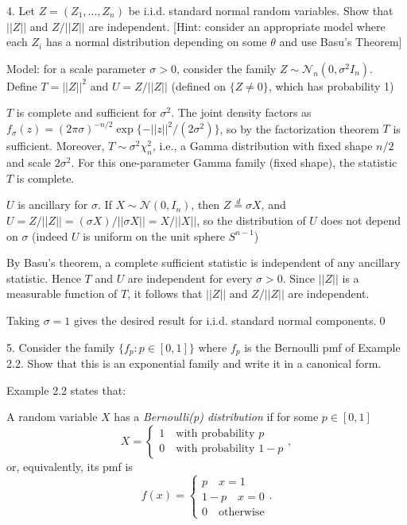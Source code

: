 \documentclass[10pt]{article}
\begin{document}
\hfill 

4. Let $Z = (Z_1, …, Z_n)$ be i.i.d. standard normal random variables. Show that $||Z||$ and $Z / ||Z||$ are independent. [Hint: consider an appropriate model where each $Z_i $ has a normal distribution depending on some $\theta $ and use Basu's Theorem]

Model: for a scale parameter $\sigma > 0 $, consider the family $Z \sim \mathcal{N}_n(0, \sigma^2I_n)$. Define $T = ||Z||^2 $ and $U = Z / ||Z|| $ (defined on $\{Z \neq 0\}$, which has probability 1)

$T $ is complete and sufficient for $\sigma^2 $. The joint density factors as $f_\sigma(z) = (2\pi\sigma)^{-n / 2} \exp\{-||z||^2 / (2\sigma^2)\}$, so by the factorization theorem $T $ is sufficient. Moreover, $T \sim \sigma^2\chi_n^2 $, i.e., a Gamma distribution with fixed shape $n / 2 $ and scale $2 \sigma^2 $. For this one-parameter Gamma family (fixed shape), the statistic $T $ is complete.

$U $ is ancillary for $\sigma $. If $X \sim \mathcal{N}(0, I_n)$, then $Z \stackrel{d}{=} \sigma X $, and $U = Z / ||Z|| = (\sigma X) / ||\sigma X|| = X / ||X||$, so the distribution of $U $ does not depend on $\sigma $ (indeed $U $ is uniform on the unit sphere $S^{n - 1}$)

By Basu's theorem, a complete sufficient statistic is independent of any ancillary statistic. Hence $T $ and $U $ are independent for every $\sigma > 0 $. Since $||Z|| $ is a measurable function of $T $, it follows that $||Z||$ and $Z / ||Z|| $ are independent. 

Taking $\sigma = 1 $ gives the desired result for i.i.d. standard normal components.\qed 

\newpage

5. Consider the family $\{f_p : p \in [0, 1]\}$ where $f_p $ is the Bernoulli pmf of Example 2.2. Show that this is an exponential family and write it in a canonical form. 

Example 2.2 states that:

A random variable $X $ has a \textit{Bernoulli(p) distribution} if for some $p \in [0, 1]$
\[
X = 
\begin{cases}
    1\quad\text{with probability }p\\
    0\quad\text{with probability }1 - p
\end{cases},
\]
or, equivalently, its pmf is 
\[
f(x) = 
\begin{cases}
    p\quad x = 1\\
    1 - p\quad x = 0\\
    0\quad\text{otherwise}
\end{cases}.
\]
\end{document}
